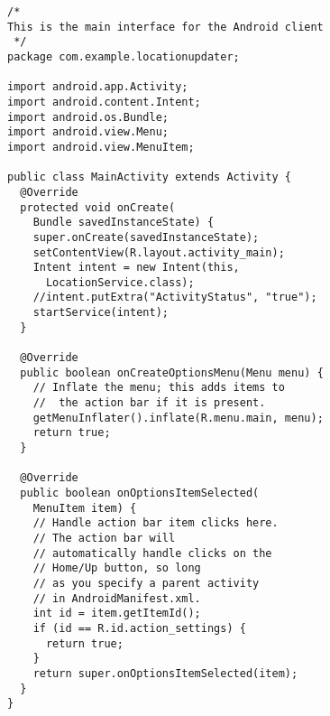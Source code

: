 \documentclass[conference]{IEEEtran}
\begin{document}
\begin{lstlisting}
/*
This is the main interface for the Android client
 */
package com.example.locationupdater;

import android.app.Activity;
import android.content.Intent;
import android.os.Bundle;
import android.view.Menu;
import android.view.MenuItem;

public class MainActivity extends Activity {
  @Override
  protected void onCreate(
    Bundle savedInstanceState) {
    super.onCreate(savedInstanceState);
    setContentView(R.layout.activity_main);
    Intent intent = new Intent(this, 
      LocationService.class);
    //intent.putExtra("ActivityStatus", "true");
    startService(intent);
  }

  @Override
  public boolean onCreateOptionsMenu(Menu menu) {
    // Inflate the menu; this adds items to
    //  the action bar if it is present.
    getMenuInflater().inflate(R.menu.main, menu);
    return true;
  }

  @Override
  public boolean onOptionsItemSelected(
    MenuItem item) {
    // Handle action bar item clicks here. 
    // The action bar will
    // automatically handle clicks on the 
    // Home/Up button, so long
    // as you specify a parent activity 
    // in AndroidManifest.xml.
    int id = item.getItemId();
    if (id == R.id.action_settings) {
      return true;
    }
    return super.onOptionsItemSelected(item);
  }
}

\end{lstlisting}
\end{document}
